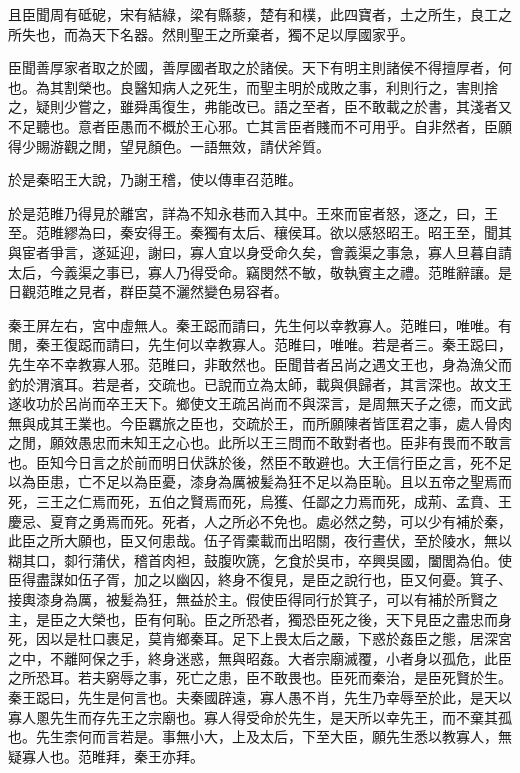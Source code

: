 且臣聞周有砥砨，宋有結綠，梁有縣藜，楚有和樸，此四寶者，土之所生，良工之所失也，而為天下名器。然則聖王之所棄者，獨不足以厚國家乎。

臣聞善厚家者取之於國，善厚國者取之於諸侯。天下有明主則諸侯不得擅厚者，何也。為其割榮也。良醫知病人之死生，而聖主明於成敗之事，利則行之，害則捨之，疑則少嘗之，雖舜禹復生，弗能改已。語之至者，臣不敢載之於書，其淺者又不足聽也。意者臣愚而不概於王心邪。亡其言臣者賤而不可用乎。自非然者，臣願得少賜游觀之閒，望見顏色。一語無效，請伏斧質。

於是秦昭王大說，乃謝王稽，使以傳車召范睢。

於是范睢乃得見於離宮，詳為不知永巷而入其中。王來而宦者怒，逐之，曰，王至。范睢繆為曰，秦安得王。秦獨有太后、穰侯耳。欲以感怒昭王。昭王至，聞其與宦者爭言，遂延迎，謝曰，寡人宜以身受命久矣，會義渠之事急，寡人旦暮自請太后，今義渠之事已，寡人乃得受命。竊閔然不敏，敬執賓主之禮。范睢辭讓。是日觀范睢之見者，群臣莫不灑然變色易容者。

秦王屏左右，宮中虛無人。秦王跽而請曰，先生何以幸教寡人。范睢曰，唯唯。有閒，秦王復跽而請曰，先生何以幸教寡人。范睢曰，唯唯。若是者三。秦王跽曰，先生卒不幸教寡人邪。范睢曰，非敢然也。臣聞昔者呂尚之遇文王也，身為漁父而釣於渭濱耳。若是者，交疏也。已說而立為太師，載與俱歸者，其言深也。故文王遂收功於呂尚而卒王天下。鄉使文王疏呂尚而不與深言，是周無天子之德，而文武無與成其王業也。今臣羈旅之臣也，交疏於王，而所願陳者皆匡君之事，處人骨肉之閒，願效愚忠而未知王之心也。此所以王三問而不敢對者也。臣非有畏而不敢言也。臣知今日言之於前而明日伏誅於後，然臣不敢避也。大王信行臣之言，死不足以為臣患，亡不足以為臣憂，漆身為厲被髪為狂不足以為臣恥。且以五帝之聖焉而死，三王之仁焉而死，五伯之賢焉而死，烏獲、任鄙之力焉而死，成荊、孟賁、王慶忌、夏育之勇焉而死。死者，人之所必不免也。處必然之勢，可以少有補於秦，此臣之所大願也，臣又何患哉。伍子胥橐載而出昭關，夜行晝伏，至於陵水，無以糊其口，厀行蒲伏，稽首肉袒，鼓腹吹篪，乞食於吳市，卒興吳國，闔閭為伯。使臣得盡謀如伍子胥，加之以幽囚，終身不復見，是臣之說行也，臣又何憂。箕子、接輿漆身為厲，被髪為狂，無益於主。假使臣得同行於箕子，可以有補於所賢之主，是臣之大榮也，臣有何恥。臣之所恐者，獨恐臣死之後，天下見臣之盡忠而身死，因以是杜口裹足，莫肯鄉秦耳。足下上畏太后之嚴，下惑於姦臣之態，居深宮之中，不離阿保之手，終身迷惑，無與昭姦。大者宗廟滅覆，小者身以孤危，此臣之所恐耳。若夫窮辱之事，死亡之患，臣不敢畏也。臣死而秦治，是臣死賢於生。秦王跽曰，先生是何言也。夫秦國辟遠，寡人愚不肖，先生乃幸辱至於此，是天以寡人慁先生而存先王之宗廟也。寡人得受命於先生，是天所以幸先王，而不棄其孤也。先生柰何而言若是。事無小大，上及太后，下至大臣，願先生悉以教寡人，無疑寡人也。范睢拜，秦王亦拜。

